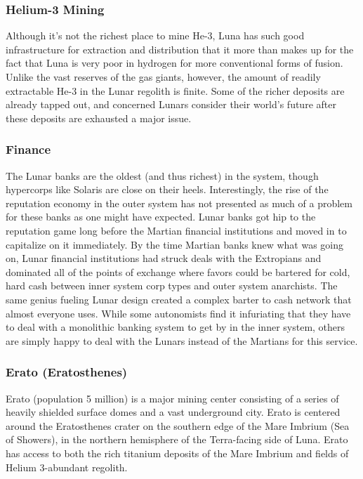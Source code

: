 \subsubsection{Helium-3 Mining}

Although it's not the richest place to mine He-3, Luna 
has such good infrastructure for extraction and distribution
that it more than makes up for the fact that
Luna is very poor in hydrogen for more conventional 
forms of fusion. Unlike the vast reserves of the gas 
giants, however, the amount of readily extractable 
He-3 in the Lunar regolith is finite. Some of the richer 
deposits are already tapped out, and concerned Lunars 
consider their world's future after these deposits are 
exhausted a major issue.

\subsubsection{Finance}

The Lunar banks are the oldest (and thus richest) in 
the system, though hypercorps like Solaris are close 
on their heels. Interestingly, the rise of the reputation 
economy in the outer system has not presented as 
much of a problem for these banks as one might have 
expected. Lunar banks got hip to the reputation game 
long before the Martian financial institutions and 
moved in to capitalize on it immediately. By the time 
Martian banks knew what was going on, Lunar financial
institutions had struck deals with the Extropians
and dominated all of the points of exchange where 
favors could be bartered for cold, hard cash between 
inner system corp types and outer system anarchists. 
The same genius fueling Lunar design created a complex
barter to cash network that almost everyone
uses. While some autonomists find it infuriating that 
they have to deal with a monolithic banking system 
to get by in the inner system, others are simply happy 
to deal with the Lunars instead of the Martians for 
this service.

\subsubsection{Erato (Eratosthenes)}

Erato (population 5 million) is a major mining center 
consisting of a series of heavily shielded surface domes 
and a vast underground city. Erato is centered around 
the Eratosthenes crater on the southern edge of the 
Mare Imbrium (Sea of Showers), in the northern 
hemisphere of the Terra-facing side of Luna. Erato has 
access to both the rich titanium deposits of the Mare 
Imbrium and fields of Helium 3-abundant regolith.

